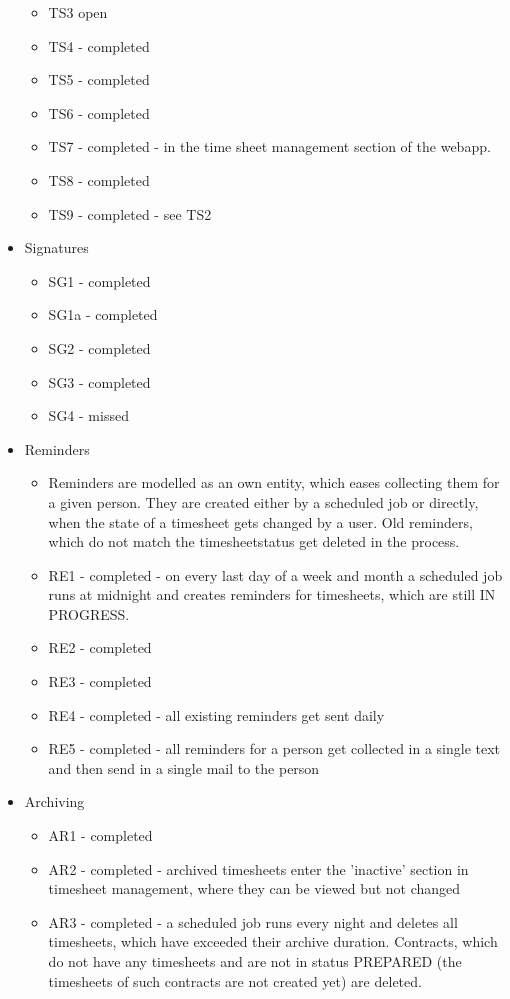 \documentclass{article}
\begin{document}
\begin{itemize}
\begin{itemize}
\item TS3 open
\item TS4 - completed
\item TS5 - completed
\item TS6 - completed
\item TS7 - completed - in the time sheet management section of the webapp.
\item TS8 - completed
\item TS9 - completed - see TS2
\end{itemize}
\item Signatures
\begin{itemize}
\item SG1 - completed
\item SG1a - completed
\item SG2 - completed
\item SG3 - completed
\item SG4 - missed
\end{itemize}
\item Reminders
\begin{itemize}
\item Reminders are modelled as an own entity, which eases collecting them for a given person. They are created either by a scheduled job or directly, when the state of a timesheet gets changed by a user. Old reminders, which do not match the timesheetstatus get deleted in the process.
\item RE1 - completed - on every last day of a week and month a scheduled job runs at midnight and creates reminders for timesheets, which are still IN PROGRESS.
\item RE2 - completed
\item RE3 - completed
\item RE4 - completed - all existing reminders get sent daily
\item RE5 - completed - all reminders for a person get collected in a single text and then send in a single mail to the person
\end{itemize}
\item Archiving
\begin{itemize}
\item AR1 - completed
\item AR2 - completed - archived timesheets enter the 'inactive' section in timesheet management, where they can be viewed but not changed
\item AR3 - completed - a scheduled job runs every night and deletes all timesheets, which have exceeded their archive duration. Contracts, which do not have any timesheets and are not in status PREPARED (the timesheets of such contracts are not created yet) are deleted.

\end{itemize}
\end{itemize}
\end{document}
